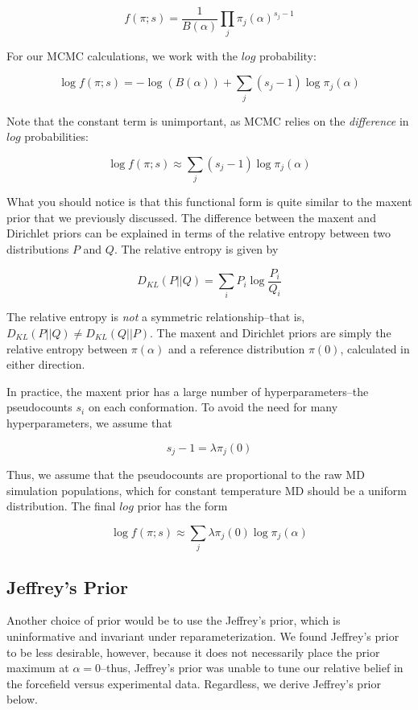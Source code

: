 \documentclass[journal=jacsat,manuscript=article]{achemso}
\begin{document}
$$f(\pi;s) = \frac{1}{B(\alpha)} \prod_j \pi_j(\alpha)^{s_j - 1}$$

For our MCMC calculations, we work with the $log$ probability:

$$\log f(\pi;s) = -\log(B(\alpha)) + \sum_j (s_j - 1) \log \pi_j(\alpha)$$

Note that the constant term is unimportant, as MCMC relies on the \emph{difference} in $log$ probabilities:

$$\log f(\pi;s) \approx \sum_j (s_j - 1) \log \pi_j(\alpha)$$

What you should notice is that this functional form is quite similar to the maxent prior that we previously discussed.  The difference between the maxent and Dirichlet priors can be explained in terms of the relative entropy between two distributions $P$ and $Q$.  The relative entropy is given by

$$D_{KL}(P||Q) = \sum_i P_i \log \frac{P_i}{Q_i}$$

The relative entropy is \emph{not} a symmetric relationship--that is, $D_{KL}(P||Q) \ne D_{KL}(Q||P)$.  The maxent and Dirichlet priors are simply the relative entropy between $\pi(\alpha)$ and a reference distribution $\pi(0)$, calculated in either direction.  

In practice, the maxent prior has a large number of hyperparameters--the pseudocounts $s_i$ on each conformation.  To avoid the need for many hyperparameters, we assume that 

$$s_j - 1 = \lambda \pi_j(0)$$

Thus, we assume that the pseudocounts are proportional to the raw MD simulation populations, which for constant temperature MD should be a uniform distribution.  The final $log$ prior has the form

$$\log f(\pi;s) \approx \sum_j \lambda \pi_j(0) \log \pi_j(\alpha)$$


\subsection{Jeffrey's Prior}

Another choice of prior would be to use the Jeffrey's prior, which is uninformative and invariant under reparameterization.  We found Jeffrey's prior to be less desirable, however, because it does not necessarily place the prior maximum at $\alpha = 0$--thus, Jeffrey's prior was unable to tune our relative belief in the forcefield versus experimental data.  Regardless, we derive Jeffrey's prior below.
\end{document}
